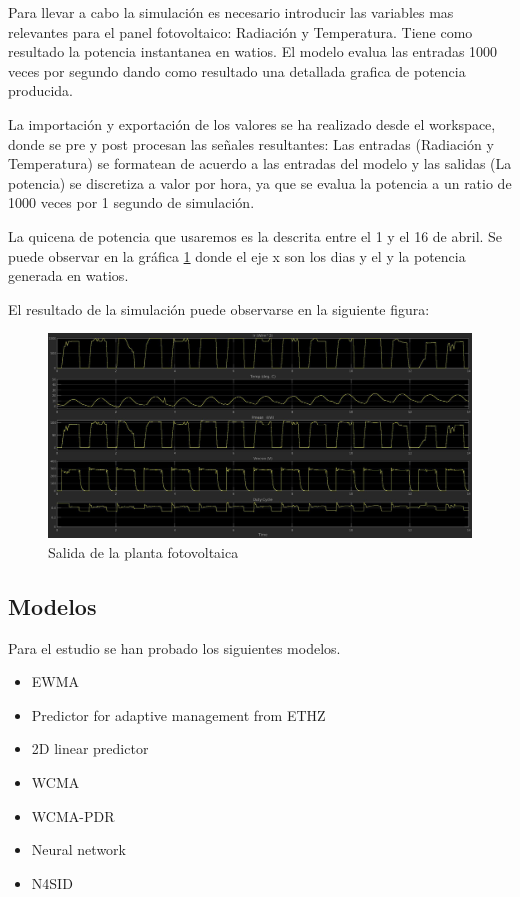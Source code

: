 Para llevar a cabo la simulación es necesario introducir las variables mas relevantes para el panel fotovoltaico: Radiación y Temperatura. Tiene como resultado la potencia instantanea en watios. El modelo evalua las entradas 1000 veces por segundo dando como resultado una detallada grafica de potencia producida.

La importación y exportación de los valores se ha realizado desde el workspace, donde se pre y post procesan las señales resultantes: Las entradas (Radiación y Temperatura) se formatean de acuerdo a las entradas del modelo y las salidas (La potencia) se discretiza a valor por hora, ya que se evalua la potencia a un ratio de 1000 veces por 1 segundo de simulación.

La quicena de potencia que usaremos es la descrita entre el 1 y el 16 de abril. Se puede observar en la gráfica \ref{fig:Ppv_output} donde el eje x son los dias y el y la potencia generada en watios.

El resultado de la simulación puede observarse en la siguiente figura:

\begin{figure}[h]
    \includegraphics[width=\textwidth]{Model_cur_outputs_010417.jpg}
    \caption{Salida de la planta fotovoltaica}
    \label{fig:Ppv_output}
\end{figure}

\subsection{Modelos}
\label{sub:Modelos}

Para el estudio se han probado los siguientes modelos.

\begin{itemize}
    \item EWMA
    \item Predictor for adaptive management from ETHZ
    \item 2D linear predictor
    \item WCMA
    \item WCMA-PDR
    \item Neural network
    \item N4SID
\end{itemize}

